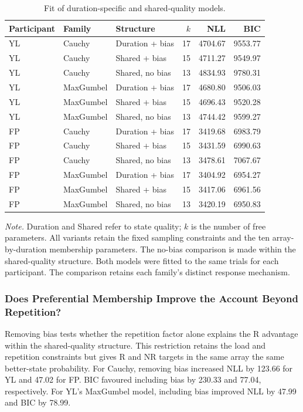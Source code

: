 \begin{table}[htbp]
\centering
\caption{Fit of duration-specific and shared-quality models.}
\label{tab:exp3_model_comparison}
\small
\begin{tabular}{lllrrr}
\hline
Participant & Family & Structure & $k$ & NLL & BIC \\
\hline
YL & Cauchy & Duration + bias & 17 & 4704.67 & 9553.77 \\
YL & Cauchy & Shared + bias & 15 & 4711.27 & 9549.97 \\
YL & Cauchy & Shared, no bias & 13 & 4834.93 & 9780.31 \\
YL & MaxGumbel & Duration + bias & 17 & 4680.80 & 9506.03 \\
YL & MaxGumbel & Shared + bias & 15 & 4696.43 & 9520.28 \\
YL & MaxGumbel & Shared, no bias & 13 & 4744.42 & 9599.27 \\
FP & Cauchy & Duration + bias & 17 & 3419.68 & 6983.79 \\
FP & Cauchy & Shared + bias & 15 & 3431.59 & 6990.63 \\
FP & Cauchy & Shared, no bias & 13 & 3478.61 & 7067.67 \\
FP & MaxGumbel & Duration + bias & 17 & 3404.92 & 6954.27 \\
FP & MaxGumbel & Shared + bias & 15 & 3417.06 & 6961.56 \\
FP & MaxGumbel & Shared, no bias & 13 & 3420.19 & 6950.83 \\
\hline
\end{tabular}
\par\smallskip
\begin{minipage}{0.97\linewidth}
\small\textit{Note.} Duration and Shared refer to state quality; $k$ is the number of free parameters. All variants retain the fixed sampling constraints and the ten array-by-duration membership parameters. The no-bias comparison is made within the shared-quality structure. Both models were fitted to the same trials for each participant. The comparison retains each family's distinct response mechanism.
\end{minipage}
\end{table}

\subsubsection{Does Preferential Membership Improve the Account Beyond Repetition?}

Removing bias tests whether the repetition factor alone explains the R advantage within the shared-quality structure. This restriction retains the load and repetition constraints but gives R and NR targets in the same array the same better-state probability. For Cauchy, removing bias increased NLL by 123.66 for YL and 47.02 for FP. BIC favoured including bias by 230.33 and 77.04, respectively. For YL's MaxGumbel model, including bias improved NLL by 47.99 and BIC by 78.99.


